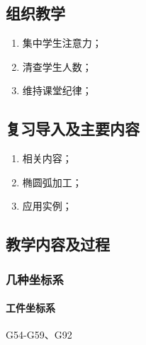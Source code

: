 \jxhj{%
	}
\skrq{%
	}

\makeshouye %

\subsection{组织教学}
\begin{enumerate}[\hspace{2em}1、]
	\item 集中学生注意力；
	\item 清查学生人数；
	\item 维持课堂纪律；
\end{enumerate}
\subsection{复习导入及主要内容}
\begin{enumerate}[\hspace{2em}1、]
\item 相关内容；
\item 椭圆弧加工；
\item 应用实例；
\end{enumerate}


\subsection{教学内容及过程}
\subsubsection{几种坐标系}
\paragraph{工件坐标系}
G54-G59、G92

